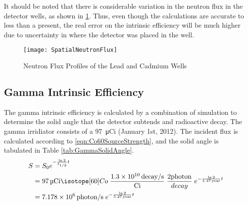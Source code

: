 \documentclass[draftcls,onecolumn]{IEEEtran}
\begin{document}
It should be noted that there is considerable variation in the neutron flux in the detector wells, as shown in \ref{fig:NeutronFluxProfiles}.
Thus, even though the calculations are accurate to less than a present, the real error on the intrinsic efficiency will be much higher due to uncertainty in where the detector was placed in the well.
\begin{figure}
	\texttt{[image: SpatialNeutronFlux]}
  \caption{Neutron Flux Profiles of the Lead and Cadmium Wells}
  \label{fig:NeutronFluxProfiles}
\end{figure}

\subsection{Gamma Intrinsic Efficiency}
The gamma intrinsic efficiency is calculated by a combination of simulation to determine the solid angle that the detector subtends and radioactive decay.
The gamma irridiator consists of a \SI{97}{\micro Ci}  (January 1st, 2012).
The incident flux is calculated according to \eqref{eqn:Co60SourceStrength}, and the solid angle is tabulated in Table \ref{tab:GammaSolidAngle}.
\begin{align}
  \label{eqn:Co60SourceStrength}
  S &= S_0 e^{-\frac{\ln{2}}{t_{1/2}} t} \\ \notag 
    &= \SI{97}{\micro Ci} \iso[60]{Co}\; \frac{\SI{1.3E10}{decay\per\second}}{\si{Ci}} \;\frac{2\text{photon}}{decay}\;e^{-\frac{ \ln{2}}{\SI{5.27}{year}}t}  \\ \notag
    &= \SI{7.178E6}{photon\per\second}\;e^{-\frac{ \ln{2}}{\SI{5.27}{year}}t} 
\end{align}
\end{document}
